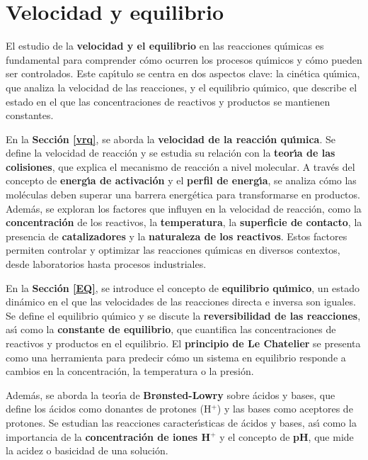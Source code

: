 \chapter{Velocidad y equilibrio}

El estudio de la \textbf{velocidad y el equilibrio} en las reacciones qu\'{\i}micas es fundamental para comprender c\'omo ocurren los procesos qu\'{\i}micos y c\'omo pueden ser controlados. Este cap\'{\i}tulo se centra en dos aspectos clave: la cin\'etica qu\'{\i}mica, que analiza la velocidad de las reacciones, y el equilibrio qu\'{\i}mico, que describe el estado en el que las concentraciones de reactivos y productos se mantienen constantes.

En la \textbf{Secci\'on \ref{vrq}}, se aborda la \textbf{velocidad de la reacci\'on qu\'{\i}mica}. Se define la velocidad de reacci\'on y se estudia su relaci\'on con la \textbf{teor\'{\i}a de las colisiones}, que explica el mecanismo de reacci\'on a nivel molecular. A trav\'es del concepto de \textbf{energ\'{\i}a de activaci\'on} y el \textbf{perfil de energ\'{\i}a}, se analiza c\'omo las mol\'eculas deben superar una barrera energ\'etica para transformarse en productos. Adem\'as, se exploran los factores que influyen en la velocidad de reacci\'on, como la \textbf{concentraci\'on} de los reactivos, la \textbf{temperatura}, la \textbf{superficie de contacto}, la presencia de \textbf{catalizadores} y la \textbf{naturaleza de los reactivos}. Estos factores permiten controlar y optimizar las reacciones qu\'{\i}micas en diversos contextos, desde laboratorios hasta procesos industriales.

En la \textbf{Secci\'on \ref{EQ}}, se introduce el concepto de \textbf{equilibrio qu\'{\i}mico}, un estado din\'amico en el que las velocidades de las reacciones directa e inversa son iguales. Se define el equilibrio qu\'{\i}mico y se discute la \textbf{reversibilidad de las reacciones}, as\'{\i} como la \textbf{constante de equilibrio}, que cuantifica las concentraciones de reactivos y productos en el equilibrio. El \textbf{principio de Le Chatelier} se presenta como una herramienta para predecir c\'omo un sistema en equilibrio responde a cambios en la concentraci\'on, la temperatura o la presi\'on.

Adem\'as, se aborda la teor\'{\i}a de \textbf{Br\o nsted-Lowry} sobre \'acidos y bases, que define los \'acidos como donantes de protones (H$^+$) y las bases como aceptores de protones. Se estudian las reacciones caracter\'{\i}sticas de \'acidos y bases, as\'{\i} como la importancia de la \textbf{concentraci\'on de iones H$^+$} y el concepto de \textbf{pH}, que mide la acidez o basicidad de una soluci\'on.

